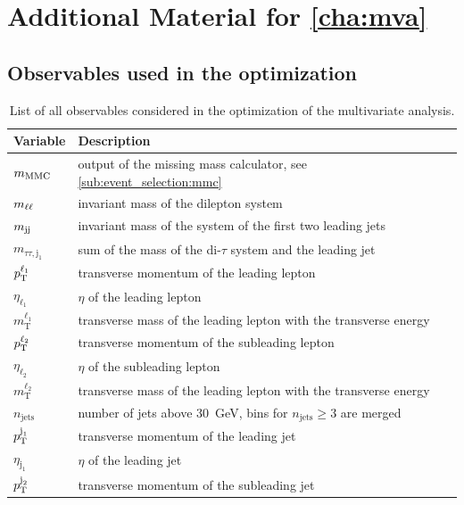 \chapter{Additional Material for \cref*{cha:mva}}\label{cha:appendix_mva}

\section{Observables used in the optimization}\label{app:mva:fulllistvars}

\begin{table}[htpb]
    \centering
    \caption{List of all observables considered in the optimization of the multivariate analysis.}
    \begin{tabular}{ll}
        \toprule
        Variable & Description \\
        \midrule
        $m_\text{MMC}$ & output of the missing mass calculator, see \cref{sub:event_selection:mmc} \\
        $m_{\ell\ell}$                  & invariant mass of the dilepton system \\
        $m_{\text{jj}}$                  & invariant mass of the system of the first two leading jets \\
        $m_{\tau\tau,\text{j}_1}$ & sum of the mass of the di-$\tau$ system and the leading jet \\
        $p_\text{T}^{\ell_1}$          & transverse momentum of the leading lepton \\
        $\eta_{\ell_1}$         & $\eta$ of the leading lepton \\
        $m_\text{T}^{\ell_1}$   & transverse mass of the leading lepton with the transverse energy \\
        $p_\text{T}^{\ell_2}$          & transverse momentum of the subleading lepton \\
        $\eta_{\ell_2}$         & $\eta$ of the subleading lepton \\
        $m_\text{T}^{\ell_2}$   & transverse mass of the leading lepton with the transverse energy \\
        $n_\text{jets}$         & number of jets above \SI{30}{\GeV}, bins for $n_\text{jets} \geq 3$ are merged\\
        $p_\text{T}^{\text{j}_1}$      & transverse momentum of the leading jet \\
        $\eta_{\text{j}_1}$     & $\eta$ of the leading jet \\
        $p_\text{T}^{\text{j}_2}$      & transverse momentum of the subleading jet \\

\end{tabular}
\end{table}
